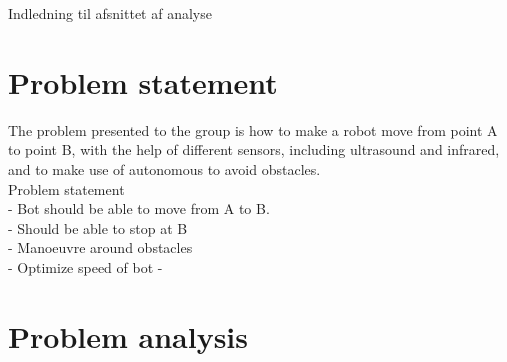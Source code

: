 Indledning til afsnittet af analyse\\

\section{Problem statement}

The problem presented to the group is how to make a robot move from point A to point B, with the help of different sensors, including ultrasound and infrared, and to make use of autonomous  to avoid obstacles. \\


Problem statement \\
- Bot should be able to move from A to B.\\
- Should be able to stop at B\\
- Manoeuvre around obstacles\\
- Optimize speed of bot
- 

\section{Problem analysis}
